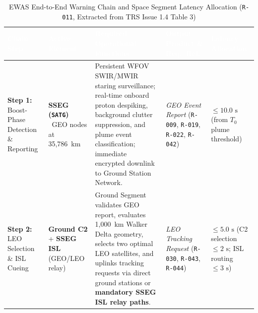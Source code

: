 \documentclass[11pt,a4paper]{article}
\newcommand{\thead}[1]{\textcolor{white}{\textbf{\textsf{#1}}}}
\providecommand{\abbr}[1]{#1}
\begin{document}
\begin{table}[H]
\centering
\caption{EWAS End-to-End Warning Chain and Space Segment Latency Allocation (\texttt{R-011}, Extracted from TRS Issue 1.4 Table 3)}
\label{tab:warning_chain_latency_archived}
{\footnotesize\setlength{\tabcolsep}{4pt}\renewcommand{\arraystretch}{1.12}%
%
%
\noindent
\begin{tabularx}{\textwidth}{|>{\raggedright\arraybackslash}p{2.1cm}|>{\raggedright\arraybackslash}p{2.2cm}|>{\raggedright\arraybackslash}X|>{\raggedright\arraybackslash}p{2.3cm}|>{\raggedright\arraybackslash}p{1.9cm}|}
    \hline
    \rowcolor{TableHeaderBlue}
    \thead{Chain Step} & \thead{Active Element} & \thead{Required Operational Functions} & \thead{Output Product \& Req.\ Ref.} & \thead{Latency Allocation} \\ \hline
    \textbf{Step 1:} \newline Boost-Phase Detection \& Reporting & \textbf{SSEG (\texttt{SATG})} \newline 6~\abbr{GEO} nodes at 35,786~km & Persistent \abbr{WFOV} \abbr{SWIR}/\abbr{MWIR} staring surveillance; real-time onboard proton despiking, background clutter suppression, and plume event classification; immediate encrypted downlink to Ground Station Network. & \emph{GEO Event Report} \newline (\texttt{R-009}, \texttt{R-019}, \texttt{R-022}, \texttt{R-042}) & \textbf{$\le 10.0\text{ s}$} \newline (from $T_0$ plume threshold) \\ \hline
    \textbf{Step 2:} \newline LEO Selection \& \abbr{ISL} Cueing & \textbf{Ground C2} + \textbf{SSEG \abbr{ISL}} \newline (\abbr{GEO}/\abbr{LEO} relay) & Ground Segment validates \abbr{GEO} report, evaluates 1,000~km Walker Delta geometry, selects two optimal \abbr{LEO} satellites, and uplinks tracking requests via direct ground stations or \textbf{mandatory \abbr{SSEG} \abbr{ISL} relay paths}. & \emph{LEO Tracking Request} \newline (\texttt{R-030}, \texttt{R-043}, \texttt{R-044}) & \textbf{$\le 5.0\text{ s}$} \newline (C2 selection $\le 2\text{ s}$; \abbr{ISL} routing $\le 3\text{ s}$) \\ \hline

\end{tabularx}}
\end{table}
\end{document}
